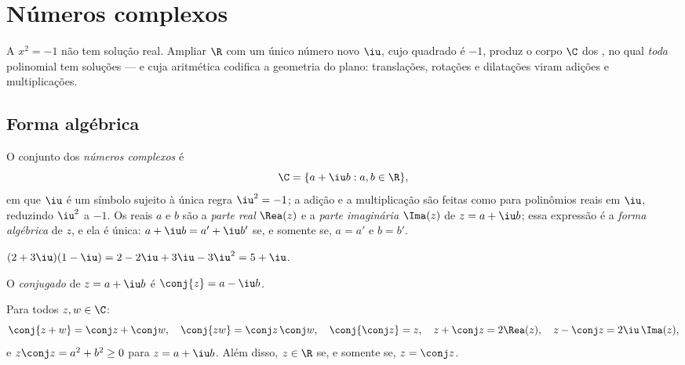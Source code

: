 \chapter{Números complexos}\label{ch:g12:complex}

A  $x^2 = -1$ não tem solução real. Ampliar $\R$ com um único número
novo $\iu$, cujo quadrado é $-1$, produz o corpo $\C$ dos , no qual \emph{toda}  polinomial tem soluções --- e cuja
aritmética codifica a geometria do plano: translações, rotações e
dilatações viram adições e multiplicações.

\section{Forma algébrica}

\begin{definition}\label{def:g12:complex:def}
O conjunto dos \emph{números complexos} é
\[
\C = \{a + \iu b : a, b \in \R\},
\]
em que $\iu$ é um símbolo sujeito à única regra $\iu^2 = -1$; a adição e a
multiplicação são feitas como para polinômios reais em $\iu$, reduzindo
$\iu^2$ a $-1$. Os reais $a$ e $b$ são a \emph{parte real} $\Rea(z)$ e a \emph{parte imaginária}
$\Ima(z)$ de $z = a + \iu b$; essa expressão é a \emph{forma
algébrica} de $z$, e ela é única:
$a + \iu b = a' + \iu b'$ se, e somente se, $a = a'$ e $b = b'$.
\end{definition}

\begin{example}
$(2 + 3\iu)(1 - \iu) = 2 - 2\iu + 3\iu - 3\iu^2 = 5 + \iu$.
\end{example}

\begin{definition}[Conjugado]\label{def:g12:complex:conjugate}
O \emph{conjugado} de $z = a + \iu b$ é
$\conj{z} = a - \iu b$.
\end{definition}

\begin{proposition}\label{prop:g12:complex:conjugate}
Para todos $z, w \in \C$:
\[
\conj{z + w} = \conj z + \conj w, \quad
\conj{zw} = \conj z\,\conj w, \quad
\conj{\conj z} = z, \quad
z + \conj z = 2\Rea(z), \quad
z - \conj z = 2\iu\,\Ima(z),
\]
e $z\conj z = a^2 + b^2 \geq 0$ para $z = a + \iu b$. Além disso,
$z \in \R$ se, e somente se, $z = \conj z$.
\end{proposition}

